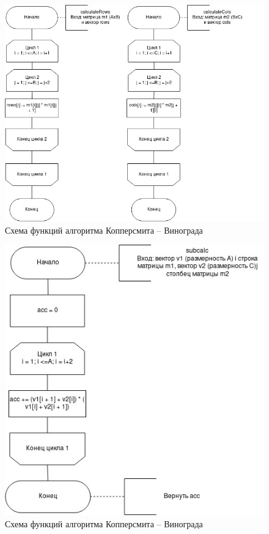 \documentclass[12pt]{report}
\begin{document}
\begin{figure}[h]
	\centering
	\includegraphics[scale=0.8]{winograd_1.jpg}
	\caption{Схема функций алгоритма Копперсмита -- Винограда}
	\label{fig:mpr}
\end{figure}

\begin{figure}[h]
	\centering
	\includegraphics[scale=1]{winograd_2.jpg}
	\caption{Схема функций алгоритма Копперсмита -- Винограда}
	\label{fig:mpr}
\end{figure}
\end{document}
